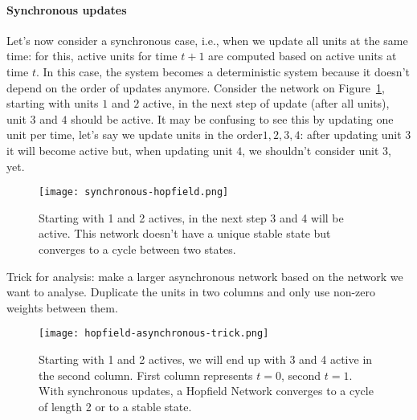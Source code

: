\documentclass[main]{subfiles}
\begin{document}
\paragraph{Synchronous updates}
Let's now consider a synchronous case, i.e., when we update all units at the same time: for this, active units for time $t+1$ are computed based on active units at time $t$.
In this case, the system becomes a deterministic system because it doesn't depend on the order of updates anymore.
Consider the network on Figure~\ref{fig:synchronous-hopfield}, starting with units $1$ and $2$ active, in the next step of update (after all units), unit $3$ and $4$ should be active. It may be confusing to see this by updating one unit per time, let's say we update units in the order${1, 2, 3, 4}$: after updating unit $3$ it will become active but, when updating unit $4$, we shouldn't consider unit $3$, yet.

\begin{figure}[H]
	\centering
	\texttt{[image: synchronous-hopfield.png]}
	\caption{Starting with 1 and 2 actives, in the next step 3 and 4 will be active. This network doesn't have a unique stable state but converges to a cycle between two states.}
	\label{fig:synchronous-hopfield}
\end{figure}

Trick for analysis: make a larger asynchronous network based on the network we want to analyse. Duplicate the units in two columns and only use non-zero weights between them.

\begin{figure}[H]
	\centering
	\texttt{[image: hopfield-asynchronous-trick.png]}
	\caption{Starting with 1 and 2 actives, we will end up with 3 and 4 active in the second column. First column represents $t=0$, second $t=1$. With synchronous updates, a Hopfield Network converges to a cycle of length 2 or to a stable state.}
\end{figure}
\end{document}
